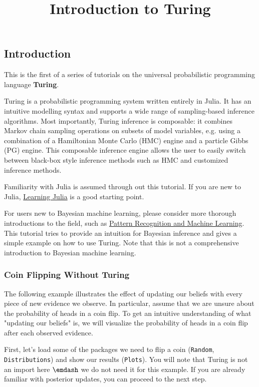 \documentclass[12pt,a4paper]{article}
\title{ Introduction to Turing }
\begin{document}
\maketitle

\subsection{Introduction}
This is the first of a series of tutorials on the universal probabilistic programming language \textbf{Turing}.

Turing is a probabilistic programming system written entirely in Julia. It has an intuitive modelling syntax and supports a wide range of sampling-based inference algorithms. Most importantly, Turing inference is composable: it combines Markov chain sampling operations on subsets of model variables, e.g. using a combination of a Hamiltonian Monte Carlo (HMC) engine and a particle Gibbs (PG) engine. This composable inference engine allows the user to easily switch between black-box style inference methods such as HMC and customized inference methods.

Familiarity with Julia is assumed through out this tutorial. If you are new to Julia, \href{https://julialang.org/learning/}{Learning Julia} is a good starting point.

For users new to Bayesian machine learning, please consider more thorough introductions to the field, such as \href{https://www.springer.com/us/book/9780387310732}{Pattern Recognition and Machine Learning}. This tutorial tries to provide an intuition for Bayesian inference and gives a simple example on how to use Turing. Note that this is not a comprehensive introduction to Bayesian machine learning.

\subsubsection{Coin Flipping Without Turing}
The following example illustrates the effect of updating our beliefs with every piece of new evidence we observe. In particular, assume that we are unsure about the probability of heads in a coin flip. To get an intuitive understanding of what "updating our beliefs" is, we will visualize the probability of heads in a coin flip after each observed evidence.

First, let's load some of the packages we need to flip a coin (\texttt{Random}, \texttt{Distributions}) and show our results (\texttt{Plots}). You will note that Turing is not an import here \ensuremath{\emdash} we do not need it for this example. If you are already familiar with posterior updates, you can proceed to the next step.
\end{document}
